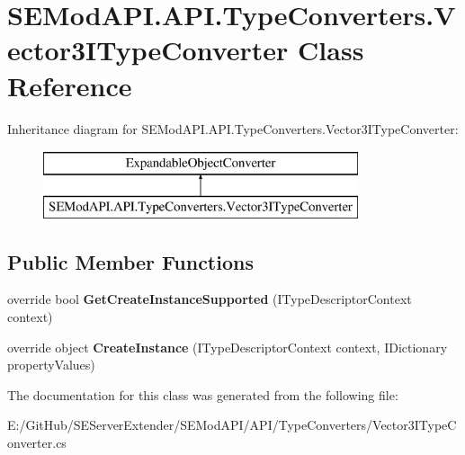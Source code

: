 \hypertarget{class_s_e_mod_a_p_i_1_1_a_p_i_1_1_type_converters_1_1_vector3_i_type_converter}{}\section{S\+E\+Mod\+A\+P\+I.\+A\+P\+I.\+Type\+Converters.\+Vector3\+I\+Type\+Converter Class Reference}
\label{class_s_e_mod_a_p_i_1_1_a_p_i_1_1_type_converters_1_1_vector3_i_type_converter}
Inheritance diagram for S\+E\+Mod\+A\+P\+I.\+A\+P\+I.\+Type\+Converters.\+Vector3\+I\+Type\+Converter\+:\begin{figure}[H]
\begin{center}
\leavevmode
\includegraphics[height=2.000000cm]{class_s_e_mod_a_p_i_1_1_a_p_i_1_1_type_converters_1_1_vector3_i_type_converter}
\end{center}
\end{figure}
\subsection*{Public Member Functions}
\begin{DoxyCompactItemize}
\item 
\hypertarget{class_s_e_mod_a_p_i_1_1_a_p_i_1_1_type_converters_1_1_vector3_i_type_converter_ad8b9c37bfc62a74a09f08876009f19cd}{}override bool {\bfseries Get\+Create\+Instance\+Supported} (I\+Type\+Descriptor\+Context context)\label{class_s_e_mod_a_p_i_1_1_a_p_i_1_1_type_converters_1_1_vector3_i_type_converter_ad8b9c37bfc62a74a09f08876009f19cd}

\item 
\hypertarget{class_s_e_mod_a_p_i_1_1_a_p_i_1_1_type_converters_1_1_vector3_i_type_converter_ac390f647377055895ce34f822ba70c8b}{}override object {\bfseries Create\+Instance} (I\+Type\+Descriptor\+Context context, I\+Dictionary property\+Values)\label{class_s_e_mod_a_p_i_1_1_a_p_i_1_1_type_converters_1_1_vector3_i_type_converter_ac390f647377055895ce34f822ba70c8b}

\end{DoxyCompactItemize}


The documentation for this class was generated from the following file\+:\begin{DoxyCompactItemize}
\item 
E\+:/\+Git\+Hub/\+S\+E\+Server\+Extender/\+S\+E\+Mod\+A\+P\+I/\+A\+P\+I/\+Type\+Converters/Vector3\+I\+Type\+Converter.\+cs\end{DoxyCompactItemize}
